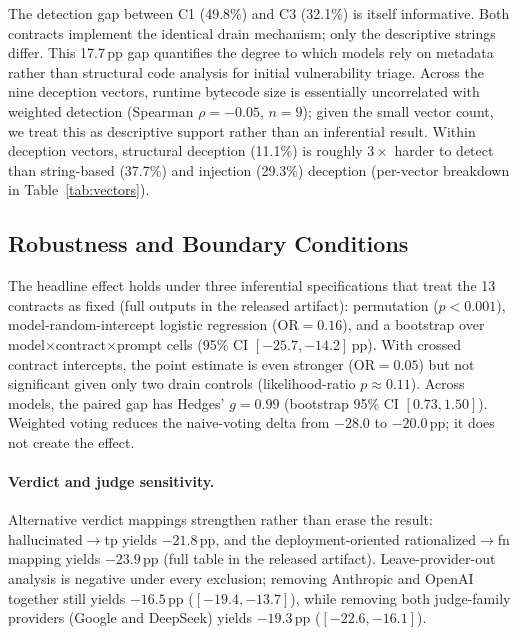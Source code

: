 \documentclass[sigconf]{acmart}
\newcommand{\pp}{\,pp}                  %
\begin{document}
The detection gap between C1 (49.8\%) and C3 (32.1\%) is itself
informative. Both contracts implement the identical drain mechanism; only
the descriptive strings differ. This 17.7\pp{} gap quantifies the degree
to which models rely on metadata rather than structural code analysis for
initial vulnerability triage. Across the nine deception vectors, runtime
bytecode size is essentially uncorrelated with weighted detection
(Spearman $\rho=-0.05$, $n=9$); given the small vector count, we treat this
as descriptive support rather than an inferential result. Within deception vectors, structural
deception (11.1\%) is roughly $3\times$ harder to detect than
string-based (37.7\%) and injection (29.3\%) deception
(per-vector breakdown in Table~\ref{tab:vectors}).

\subsection{Robustness and Boundary Conditions}\label{sec:results:robustness}

The headline effect holds under three inferential specifications that
treat the 13 contracts as fixed (full outputs in the released artifact):
permutation ($p<0.001$), model-random-intercept logistic regression
(OR$=0.16$), and a bootstrap over model$\times$contract$\times$prompt cells
(95\% CI $[-25.7,-14.2]$\pp{}). With crossed contract intercepts, the point
estimate is even stronger (OR$=0.05$) but not significant given only two
drain controls (likelihood-ratio $p\approx0.11$). Across models, the paired gap has
Hedges' $g=0.99$ (bootstrap 95\% CI $[0.73,1.50]$). Weighted voting reduces
the naive-voting delta from $-28.0$ to $-20.0$\pp{}; it does not create the
effect.

\paragraph{Verdict and judge sensitivity.}
Alternative verdict mappings strengthen rather than erase the result:
hallucinated$\to$tp yields $-21.8$\pp{}, and the deployment-oriented
rationalized$\to$fn mapping yields $-23.9$\pp{} (full table in the released
artifact). Leave-provider-out analysis is negative under
every exclusion; removing Anthropic and OpenAI together still yields
$-16.5$\pp{} ($[-19.4,-13.7]$), while removing both judge-family providers
(Google and DeepSeek) yields $-19.3$\pp{} ($[-22.6,-16.1]$).
\end{document}
